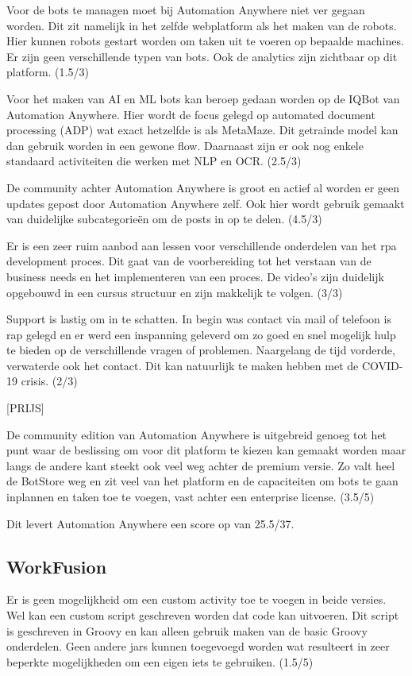 Voor de bots te managen moet bij Automation Anywhere niet ver gegaan worden. Dit zit namelijk in het zelfde webplatform als het maken van de robots. Hier kunnen robots gestart worden om taken uit te voeren op bepaalde machines. Er zijn geen verschillende typen van bots. Ook de analytics zijn zichtbaar op dit platform. (1.5/3)

Voor het maken van AI en ML bots kan beroep gedaan worden op de IQBot van Automation Anywhere. Hier wordt de focus gelegd op automated document processing (ADP) wat exact hetzelfde is als MetaMaze. Dit getrainde model kan dan gebruik worden in een gewone flow. Daarnaast zijn er ook nog enkele standaard activiteiten die werken met NLP en OCR. (2.5/3)

De community achter Automation Anywhere is groot en actief al worden er geen updates gepost door Automation Anywhere zelf. Ook hier wordt gebruik gemaakt van duidelijke subcategorieën om de posts in op te delen. (4.5/3) 

Er is een zeer ruim aanbod aan lessen voor verschillende onderdelen van het \acrshort{rpa} development proces. Dit gaat van de voorbereiding tot het verstaan van de business needs en het implementeren van een proces. De video's zijn duidelijk opgebouwd in een cursus structuur en zijn makkelijk te volgen. (3/3)

Support is lastig om in te schatten. In begin was contact via mail of telefoon is rap gelegd en er werd een inspanning geleverd om zo goed en snel mogelijk hulp te bieden op de verschillende vragen of problemen. Naargelang de tijd vorderde, verwaterde ook het contact. Dit kan natuurlijk te maken hebben met de COVID-19 crisis. (2/3)

[PRIJS]

De community edition van Automation Anywhere is uitgebreid genoeg tot het punt waar de beslissing om voor dit platform te kiezen kan gemaakt worden maar langs de andere kant steekt ook veel weg achter de premium versie. Zo valt heel de BotStore weg en zit veel van het platform en de capaciteiten om bots te gaan inplannen en taken toe te voegen, vast achter een enterprise license. (3.5/5)

Dit levert Automation Anywhere een score op van 25.5/37.

\subsection{WorkFusion}

Er is geen mogelijkheid om een custom activity toe te voegen in beide versies. Wel kan een custom script geschreven worden dat code kan uitvoeren. Dit script is geschreven in Groovy en kan alleen gebruik maken van de basic Groovy onderdelen. Geen andere jars kunnen toegevoegd worden wat resulteert in zeer beperkte mogelijkheden om een eigen iets te gebruiken. (1.5/5)


